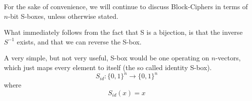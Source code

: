 \begin{rem}
For the sake of convenience, we will continue to discuss Block-Ciphers
in terms of $n$-bit S-boxes, unless otherwise stated.
\end{rem}

What immediately follows from the fact that S is a bijection, is that
the inverse $S^{-1}$ exists, and that we can reverse the S-box.

\begin{example}
A very simple, but not very useful, S-box would be one operating on $n$-vectors, which just maps
every element to itself (the so called identity S-box).
\begin{equation}
S_{id}: \{0,1\}^n \rightarrow \{0,1\}^n
\end{equation}
where
\begin{equation}
S_{id}(x) = x
\end{equation}

\end{example}

